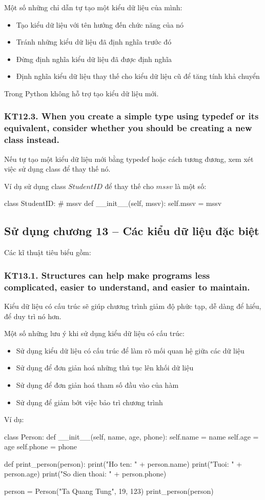 \documentclass[12pt]{report}
\begin{document}
\noindent Một số những chỉ dẫn tự tạo một kiểu dữ liệu của mình: 
\begin{itemize}
	\item Tạo kiểu dữ liệu với tên hướng đến chức năng của nó 
	\item Tránh những kiểu dữ liệu đã định nghĩa trước đó 
	\item Đừng định nghĩa kiểu dữ liệu đã được định nghĩa 
	\item Định nghĩa kiểu dữ liệu thay thế cho kiểu dữ liệu cũ để tăng tính khả chuyển 
\end{itemize}
Trong Python không hỗ trợ tạo kiểu dữ liệu mới. 

\subsubsection{KT12.3. When you create a simple type using typedef or its equivalent, consider whether you should be creating a new class instead.}
Nếu tự tạo một kiểu dữ liệu mới bằng typedef hoặc cách tương đương, xem xét việc sử dụng class để thay thế nó.

Ví dụ sử dụng class $StudentID$ để thay thế cho $mssv$ là một số: 
\begin{python}
class StudentID:
	# mssv
	def __init__(self, mssv):
		self.mssv = mssv

\end{python}

\subsection{Sử dụng chương 13 – Các kiểu dữ liệu đặc biệt}
\noindent Các kĩ thuật tiêu biểu gồm:

\subsubsection{KT13.1. Structures can help make programs less complicated, easier to understand, and easier to maintain.}
Kiểu dữ liệu có cấu trúc sẽ giúp chương trình giảm độ phức tạp, dễ dàng để hiểu, để duy trì nó hơn.
 
\noindent Một số những lưu ý khi sử dụng kiểu dữ liệu có cấu trúc: 
\begin{itemize}
	\item Sử dụng kiểu dữ liệu có cấu trúc để làm rõ mối quan hệ giữa các dữ liệu 
	\item Sử dụng để đơn giản hoá những thủ tục lên khối dữ liệu 
	\item Sử dụng để đơn giản hoá tham số đầu vào của hàm 
	\item Sử dụng để giảm bớt việc bảo trì chương trình
\end{itemize}
Ví dụ:
\begin{python}
class Person:
	def __init__(self, name, age, phone):
		self.name = name
		self.age = age
		self.phone = phone

def print_person(person):
	print("Ho ten: " + person.name)
	print("Tuoi: " + person.age)
	print("So dien thoai: " + person.phone)

person = Person("Ta Quang Tung", 19, 123)
print_person(person)

\end{python}
\end{document}
